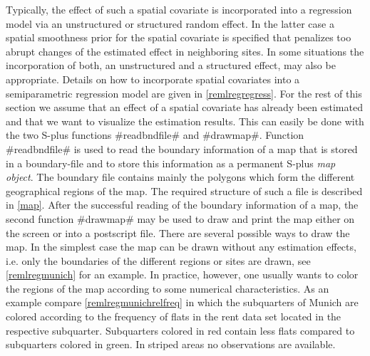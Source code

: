 Typically, the effect of such a spatial covariate is incorporated
into a regression model via an unstructured or structured random
effect. In the latter case a spatial smoothness prior for the
spatial covariate is specified that penalizes too abrupt changes
of the estimated effect in neighboring sites. In some situations
the incorporation of both, an unstructured and a structured
effect, may also be appropriate. Details on how to incorporate
spatial covariates into a semiparametric regression  model are
given in \autoref{remlregregress}. For the rest of this section we
assume that an effect of a spatial covariate has already been
estimated and that we want to visualize the estimation results.
This can easily be done with the two S-plus functions
#readbndfile# and #drawmap#. Function #readbndfile# is used to
read the boundary information of a map that is stored in a
boundary-file and to store this information as a permanent S-plus
{\em map object}. The boundary file contains mainly the polygons which
form the different geographical regions of the map. The required
structure of such a file is described in \autoref{map}. After the
successful reading of the boundary information of a map, the
second function #drawmap# may be used to draw and print the map
either on the screen or into a postscript file. There are several
possible ways to draw the map. In the simplest case the map can be
drawn without any estimation effects, i.e. only the boundaries of
the different regions or sites are drawn, see
\autoref{remlregmunich} for an example. In practice, however, one
usually wants to color the regions of the map according to some
numerical characteristics. As an example compare
\autoref{remlregmunichrelfreq} in which the subquarters of Munich
are colored according to the frequency of flats in the rent data
set located in the respective subquarter. Subquarters colored in
red contain less flats compared to subquarters colored in green.
In striped areas no observations are available.

